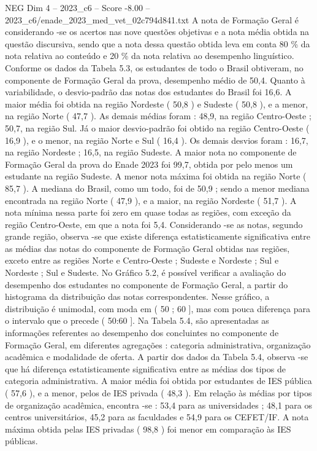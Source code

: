 \begin{textsample}{NEG Dim 4 – 2023\_c6 – Score -8.00 – 2023\_c6/enade\_2023\_med\_vet\_02c794d841.txt}
A nota de Formação Geral é considerando -se os acertos nas nove questões objetivas e a nota média obtida na questão discursiva, sendo que a nota dessa questão obtida leva em conta 80 \% da nota relativa ao conteúdo e 20 \% da nota relativa ao desempenho linguístico.
Conforme os dados da Tabela 5.3, os estudantes de todo o Brasil obtiveram, no componente de Formação Geral da prova, desempenho médio de 50,4.
Quanto à variabilidade, o desvio-padrão das notas dos estudantes do Brasil foi 16,6.
A maior média foi obtida na região Nordeste ( 50,8 ) e Sudeste ( 50,8 ), e a menor, na região Norte ( 47,7 ).
As demais médias foram : 48,9, na região Centro-Oeste ; 50,7, na região Sul.
Já o maior desvio-padrão foi obtido na região Centro-Oeste ( 16,9 ), e o menor, na região Norte e Sul ( 16,4 ).
Os demais desvios foram : 16,7, na região Nordeste ; 16,5, na região Sudeste.
A maior nota no componente de Formação Geral da prova do Enade 2023 foi 99,7, obtida por pelo menos um estudante na região Sudeste.
A menor nota máxima foi obtida na região Norte ( 85,7 ).
A mediana do Brasil, como um todo, foi de 50,9 ; sendo a menor mediana encontrada na região Norte ( 47,9 ), e a maior, na região Nordeste ( 51,7 ).
A nota mínima nessa parte foi zero em quase todas as regiões, com exceção da região Centro-Oeste, em que a nota foi 5,4.
Considerando -se as notas, segundo grande região, observa -se que existe diferença estatisticamente significativa entre as médias das notas do componente de Formação Geral obtidas nas regiões, exceto entre as regiões Norte e Centro-Oeste ; Sudeste e Nordeste ; Sul e Nordeste ; Sul e Sudeste.
No Gráfico 5.2, é possível verificar a avaliação do desempenho dos estudantes no componente de Formação Geral, a partir do histograma da distribuição das notas correspondentes.
Nesse gráfico, a distribuição é unimodal, com moda em ( 50 ; 60 ], mas com pouca diferença para o intervalo que o precede ( 50:60 ].
Na Tabela 5.4, são apresentadas as informações referentes ao desempenho dos concluintes no componente de Formação Geral, em diferentes agregações : categoria administrativa, organização acadêmica e modalidade de oferta.
A partir dos dados da Tabela 5.4, observa -se que há diferença estatisticamente significativa entre as médias dos tipos de categoria administrativa.
A maior média foi obtida por estudantes de IES pública ( 57,6 ), e a menor, pelos de IES privada ( 48,3 ).
Em relação às médias por tipos de organização acadêmica, encontra -se : 53,4 para as universidades ; 48,1 para os centros universitários, 45,2 para as faculdades e 54,9 para os CEFET/IF.
A nota máxima obtida pelas IES privadas ( 98,8 ) foi menor em comparação às IES públicas.

\end{textsample}
